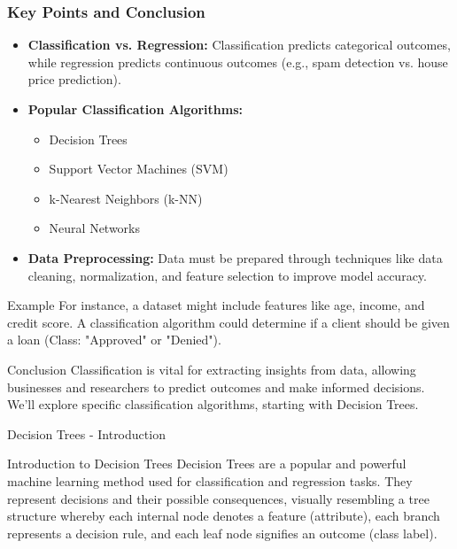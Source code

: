 \documentclass[aspectratio=169]{beamer}
\begin{document}
\begin{frame}[fragile]
    \frametitle{Key Points and Conclusion}
    \begin{itemize}
        \item \textbf{Classification vs. Regression:} Classification predicts categorical outcomes, while regression predicts continuous outcomes (e.g., spam detection vs. house price prediction).
        
        \item \textbf{Popular Classification Algorithms:} 
        \begin{itemize}
            \item Decision Trees
            \item Support Vector Machines (SVM)
            \item k-Nearest Neighbors (k-NN)
            \item Neural Networks
        \end{itemize}
        
        \item \textbf{Data Preprocessing:} Data must be prepared through techniques like data cleaning, normalization, and feature selection to improve model accuracy.
    \end{itemize}
    
    \begin{block}{Example}
        For instance, a dataset might include features like age, income, and credit score. A classification algorithm could determine if a client should be given a loan (Class: "Approved" or "Denied").
    \end{block}
    
    \begin{block}{Conclusion}
    Classification is vital for extracting insights from data, allowing businesses and researchers to predict outcomes and make informed decisions. We'll explore specific classification algorithms, starting with Decision Trees.
    \end{block}
\end{frame}

\begin{frame}[fragile]{Decision Trees - Introduction}
    \begin{block}{Introduction to Decision Trees}
        Decision Trees are a popular and powerful machine learning method used for classification and regression tasks. 
        They represent decisions and their possible consequences, visually resembling a tree structure whereby each internal node denotes a feature (attribute), each branch represents a decision rule, and each leaf node signifies an outcome (class label).
    \end{block}
\end{frame}
\end{document}
